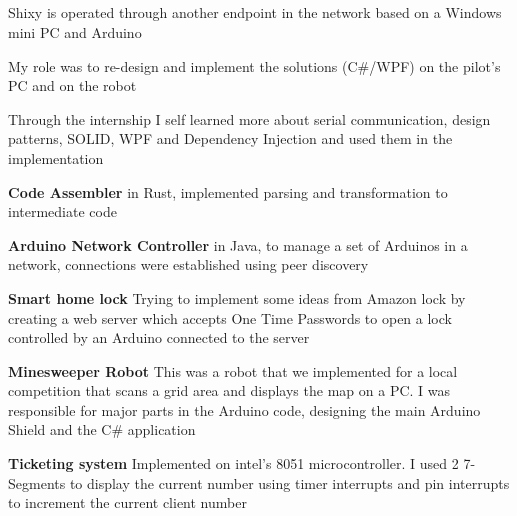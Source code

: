 \documentclass[paper=a4,fontsize=11pt]{scrartcl} %
\newcommand{\colorsubsec}[1]{\subsection{\color{AccentColor}{#1}}}
\begin{document}
\colorsubsec{Shixy [Advertisement Robot], TMentors, Cairo - Intern Software Engineer - October 2015 to August 2016}
\begin{itemize*}
	\item Shixy is operated through another endpoint in the network based on a Windows mini PC and Arduino
	\item My role was to re-design and implement the solutions (C\#/WPF) on the pilot's PC and on the robot
	\item Through the internship I self learned more about serial communication, design patterns, SOLID, WPF and Dependency Injection and used them in the implementation
\end{itemize*}
\begin{itemize*}
	\item \textbf{Code Assembler} in Rust, implemented parsing and transformation to intermediate code
	\item \textbf{Arduino Network Controller} in Java, to manage a set of Arduinos in a network, connections were established using peer discovery
	\item \textbf{Smart home lock} Trying to implement some ideas from Amazon lock by creating a web server which accepts One Time Passwords to open a lock controlled by an Arduino connected to the server
	\item \textbf{Minesweeper Robot} This was a robot that we implemented for a local competition that scans a grid area and displays the map on a PC. I was responsible for major parts in the Arduino code, designing the main Arduino Shield and the C\# application
	\item \textbf{Ticketing system} Implemented on intel's 8051 microcontroller. I used 2 7-Segments to display the current number using timer interrupts and pin interrupts to increment the current client number
\end{itemize*}
\end{document}
